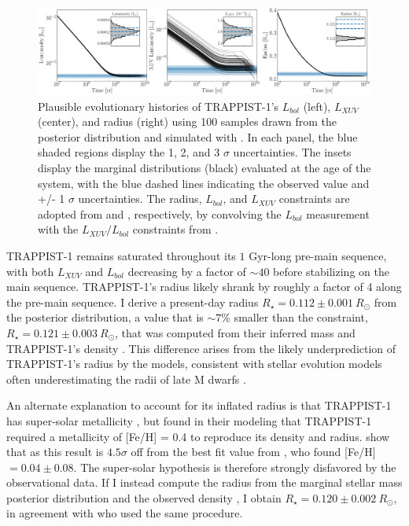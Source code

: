 \begin{figure}
	\includegraphics[width=\textwidth]{trappist1Evol.pdf}
   \caption{Plausible evolutionary histories of TRAPPIST-1's $L_{bol}$ (left), $L_{XUV}$ (center), and radius (right) using 100 samples drawn from the posterior distribution and simulated with \vplanet. In each panel, the blue shaded regions display the 1, 2, and 3 $\sigma$ uncertainties. The insets display the marginal distributions (black) evaluated at the age of the system, with the blue dashed lines indicating the observed value and +/- 1 $\sigma$ uncertainties. The radius, $L_{bol}$, and $L_{XUV}$ constraints are adopted from \citet{vanGrootel2018} and \citet{Wheatley2017}, respectively, by convolving the \citet{vanGrootel2018} $L_{bol}$ measurement with the $L_{XUV}/L_{bol}$ constraints from \citet{Wheatley2017}.}%
    \label{trap:fig:evol}%
\end{figure}

TRAPPIST-1 remains saturated throughout its $1$ Gyr-long pre-main sequence, with both $L_{XUV}$ and $L_{bol}$ decreasing by a factor of ${\sim}40$ before stabilizing on the main sequence. TRAPPIST-1's radius likely shrank by roughly a factor of 4 along the pre-main sequence. I derive a present-day radius $R_{\star} = 0.112 \pm{0.001} \ R_{\odot}$ from the posterior distribution, a value that is ${\sim} 7\%$ smaller than the \citet{vanGrootel2018} constraint, $R_{\star} = 0.121 \pm {0.003} \ R_{\odot}$, that was computed from their inferred mass and TRAPPIST-1's density \citep{Delrez2018}. This difference arises from the likely underprediction of TRAPPIST-1's radius by the \citet{Baraffe2015} models, consistent with stellar evolution models often underestimating the radii of late M dwarfs \citep{Reid2005,Spada2013}. 

An alternate explanation to account for its inflated radius is that TRAPPIST-1 has super-solar metallicity \citep{Burgasser2017,vanGrootel2018}, but \citet{vanGrootel2018} found in their modeling that TRAPPIST-1 required a metallicity of [Fe/H] = 0.4 to reproduce its density and radius. \citet{vanGrootel2018} show that as this result is $4.5\sigma$ off from the best fit value from \citet{Gillon2016}, who found [Fe/H] $= 0.04 \pm{0.08}$. The super-solar hypothesis is therefore strongly disfavored by the observational data. If I instead compute the radius from the marginal stellar mass posterior distribution and the observed density \citep{Delrez2018}, I obtain $R_{\star} = 0.120 \pm{0.002} \ R_{\odot}$, in agreement with \citet{vanGrootel2018} who used the same procedure.

